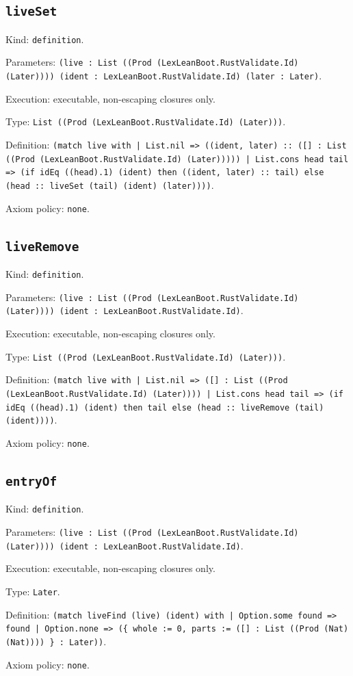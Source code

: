 \documentclass[11pt]{article}
\begin{document}
\subsection*{\texttt{liveSet}}
\noindent Kind: \texttt{definition}.\par
\noindent Parameters: \texttt{(live : List ((Prod (LexLeanBoot.RustValidate.Id) (Later)))) (ident : LexLeanBoot.RustValidate.Id) (later : Later)}.\par
\noindent Execution: executable, non-escaping closures only.\par
\noindent Type: \texttt{List ((Prod (LexLeanBoot.RustValidate.Id) (Later)))}.\par
\noindent Definition: \texttt{(match live with | List.nil => ((ident, later) :: ([] : List ((Prod (LexLeanBoot.RustValidate.Id) (Later))))) | List.cons head tail => (if idEq ((head).1) (ident) then ((ident, later) :: tail) else (head :: liveSet (tail) (ident) (later))))}.\par
\noindent Axiom policy: \texttt{none}.\par
\subsection*{\texttt{liveRemove}}
\noindent Kind: \texttt{definition}.\par
\noindent Parameters: \texttt{(live : List ((Prod (LexLeanBoot.RustValidate.Id) (Later)))) (ident : LexLeanBoot.RustValidate.Id)}.\par
\noindent Execution: executable, non-escaping closures only.\par
\noindent Type: \texttt{List ((Prod (LexLeanBoot.RustValidate.Id) (Later)))}.\par
\noindent Definition: \texttt{(match live with | List.nil => ([] : List ((Prod (LexLeanBoot.RustValidate.Id) (Later)))) | List.cons head tail => (if idEq ((head).1) (ident) then tail else (head :: liveRemove (tail) (ident))))}.\par
\noindent Axiom policy: \texttt{none}.\par
\subsection*{\texttt{entryOf}}
\noindent Kind: \texttt{definition}.\par
\noindent Parameters: \texttt{(live : List ((Prod (LexLeanBoot.RustValidate.Id) (Later)))) (ident : LexLeanBoot.RustValidate.Id)}.\par
\noindent Execution: executable, non-escaping closures only.\par
\noindent Type: \texttt{Later}.\par
\noindent Definition: \texttt{(match liveFind (live) (ident) with | Option.some found => found | Option.none => (\{ whole := 0, parts := ([] : List ((Prod (Nat) (Nat)))) \} : Later))}.\par
\noindent Axiom policy: \texttt{none}.\par
\end{document}

